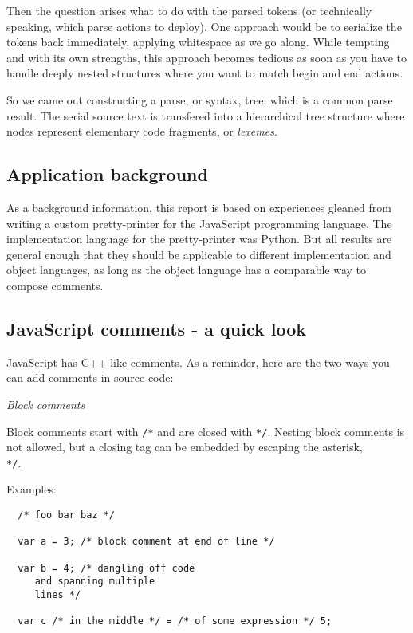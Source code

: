 \documentclass[11pt,a4paper]{article}
\begin{document}
Then the question arises what to do with the parsed tokens (or technically
speaking, which parse actions to deploy). One approach would be to serialize the
tokens back immediately, applying whitespace as we go along. While tempting and
with its own strengths, this approach becomes tedious as soon as you have to handle
deeply nested structures where you want to match begin and end actions.

So we came out constructing a parse, or syntax, tree, which is a common parse
result. The serial source text is transfered into a hierarchical tree structure
where nodes represent elementary code fragments, or \emph{lexemes}.

\subsection{Application background}

As a background information, this report is based on experiences gleaned from
writing a custom pretty-printer for the JavaScript programming language. The
implementation language for the pretty-printer was Python. But all results are
general enough that they should be applicable to different implementation and
object languages, as long as the object language has a comparable way to compose
comments.

\subsection{JavaScript comments - a quick look}

JavaScript has C++-like comments. As a reminder, here are the two ways you
can add comments in source code:

\textit{Block comments}

Block comments start with \texttt{/*} and are closed with \texttt{*/}. Nesting
block comments is not allowed, but a closing tag can be embedded by escaping the
asterisk, \texttt{\\*/}.

Examples:

\begin{verbatim}
  /* foo bar baz */

  var a = 3; /* block comment at end of line */

  var b = 4; /* dangling off code
     and spanning multiple
     lines */

  var c /* in the middle */ = /* of some expression */ 5;

\end{verbatim}
\end{document}
